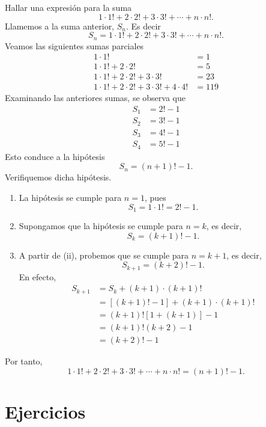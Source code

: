 \begin{example}
    Hallar una expresión para la suma
    $$1 \cdot 1! + 2 \cdot 2! + 3 \cdot 3! + \cdots + n \cdot n!.$$
    \demostracion Llamemos a la suma anterior, $S_n$. Es decir
    $$S_n=1 \cdot 1! + 2 \cdot 2! + 3 \cdot 3! + \cdots + n \cdot n!.$$
    Veamos las siguientes sumas parciales
    \begin{align*}
        1 \cdot 1! &=1 \\
        1 \cdot 1!+2 \cdot 2! &=5 \\
        1 \cdot 1!+2 \cdot 2! + 3 \cdot 3! &=23 \\
        1 \cdot 1!+2 \cdot 2! + 3 \cdot 3! +4 \cdot 4! &=119
    \end{align*}
    Examinando las anteriores sumas, se observa que
    \begin{align*}
        S_1 &=2!-1 \\
        S_2 &=3!-1 \\
        S_3 &=4!-1 \\
        S_4 &=5!-1
    \end{align*}
    Esto conduce a la hipótesis
    $$S_n=(n+1)!-1.$$
    Verifiquemos dicha hipótesis.
    \begin{enumerate}[label=\roman*.]
        \item La hipótesis se cumple para $n=1$, pues
        $$S_1=1 \cdot 1!=2!-1.$$
        \item Supongamos que la hipótesis se cumple para $n=k$, es decir,
        $$S_k=(k+1)!-1.$$
        \item A partir de (ii), probemos que se cumple para $n=k+1$, es decir,
        $$S_{k+1}=(k+2)!-1.$$
        En efecto,
        \begin{align*}
            S_{k+1} &= S_k + (k+1) \cdot (k+1)! \\
            &=[(k+1)!-1]+(k+1) \cdot (k+1)! \\
            &=(k+1)![1+(k+1)]-1 \\
            &=(k+1)!(k+2)-1 \\
            &=(k+2)!-1
        \end{align*}
    \end{enumerate}
    Por tanto,
    $$1 \cdot 1! + 2 \cdot 2! + 3 \cdot 3! + \cdots + n \cdot n! = (n+1)!-1.$$
\end{example}

\newpage

\section{Ejercicios}

